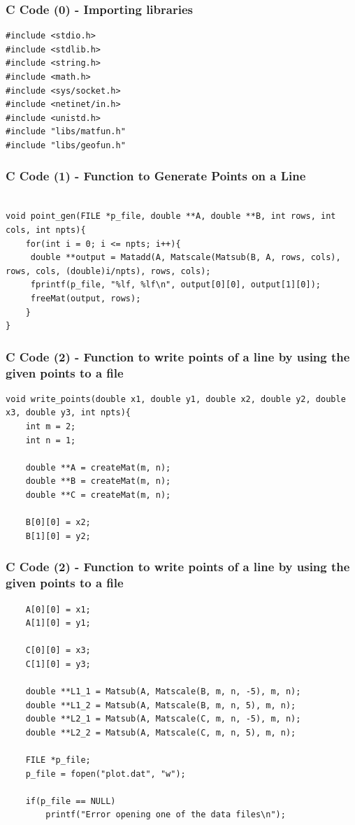 \documentclass{beamer}
\begin{document}
\begin{frame}[fragile]
    \frametitle{C Code (0) - Importing libraries}

    \begin{lstlisting}
#include <stdio.h>
#include <stdlib.h>
#include <string.h>
#include <math.h>
#include <sys/socket.h>
#include <netinet/in.h>
#include <unistd.h>
#include "libs/matfun.h"
#include "libs/geofun.h"
    \end{lstlisting}
\end{frame}
\begin{frame}[fragile]
    \frametitle{C Code (1) - Function to Generate Points on a Line}

    \begin{lstlisting}

void point_gen(FILE *p_file, double **A, double **B, int rows, int cols, int npts){
    for(int i = 0; i <= npts; i++){
     double **output = Matadd(A, Matscale(Matsub(B, A, rows, cols), rows, cols, (double)i/npts), rows, cols);
     fprintf(p_file, "%lf, %lf\n", output[0][0], output[1][0]);
     freeMat(output, rows);
    }
}

    \end{lstlisting}
\end{frame}


\begin{frame}[fragile]
    \frametitle{C Code (2) - Function to write points of a line by using the given points to a file}

    \begin{lstlisting}
void write_points(double x1, double y1, double x2, double y2, double x3, double y3, int npts){
    int m = 2;
    int n = 1;

    double **A = createMat(m, n);
    double **B = createMat(m, n);
    double **C = createMat(m, n);

    B[0][0] = x2;
    B[1][0] = y2;
    \end{lstlisting}
\end{frame}
\begin{frame}[fragile]
    \frametitle{C Code (2) - Function to write points of a line by using the given points to a file}

    \begin{lstlisting}
    A[0][0] = x1;
    A[1][0] = y1;
    
    C[0][0] = x3;
    C[1][0] = y3;

    double **L1_1 = Matsub(A, Matscale(B, m, n, -5), m, n);
    double **L1_2 = Matsub(A, Matscale(B, m, n, 5), m, n);
    double **L2_1 = Matsub(A, Matscale(C, m, n, -5), m, n);
    double **L2_2 = Matsub(A, Matscale(C, m, n, 5), m, n);
    
    FILE *p_file;
    p_file = fopen("plot.dat", "w");
    
    if(p_file == NULL)
        printf("Error opening one of the data files\n");
    \end{lstlisting}
\end{frame}
\end{document}
